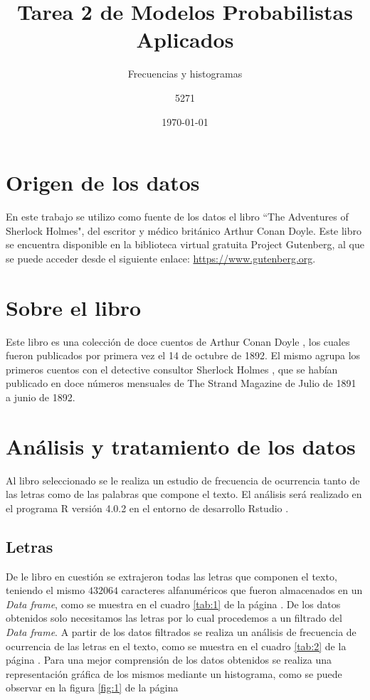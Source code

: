 \documentclass{article}
\title{Tarea 2 de Modelos Probabilistas Aplicados}
\subtitle{Frecuencias y histogramas}
\author{5271}
\date{\today}
\begin{document}
\maketitle

\section{Origen de los datos}

En este trabajo se utilizo como fuente de los datos el libro ``The Adventures of Sherlock Holmes", del escritor y médico británico Arthur Conan Doyle. Este libro se encuentra disponible en la biblioteca virtual gratuita Project Gutenberg, al que se puede acceder desde el siguiente enlace: \href{https://www.gutenberg.org}{https://www.gutenberg.org}. 

\section{Sobre el libro}

Este libro es una colección de doce cuentos de Arthur Conan Doyle , los cuales fueron publicados por primera vez el 14 de octubre de 1892. El mismo agrupa los primeros cuentos con el detective consultor Sherlock Holmes , que se habían publicado en doce números mensuales de The Strand Magazine de Julio de 1891 a junio de 1892. 

\section{Análisis y tratamiento de los datos}

Al libro seleccionado se le realiza un estudio de frecuencia de ocurrencia tanto de las letras como de las palabras que compone el texto. El análisis será realizado en el programa R versión 4.0.2 \cite{r} en el entorno de desarrollo Rstudio \cite{rstudio}. 

\subsection{Letras}
De le libro en cuestión se extrajeron todas las letras que componen el texto, teniendo el mismo $432064$ caracteres alfanuméricos que fueron almacenados en un \textit{Data frame}, como se muestra en el cuadro \ref{tab:1} de la página \pageref{tab:1}. De los datos obtenidos solo necesitamos las letras por lo cual procedemos a un filtrado del \textit{Data frame}. A partir de los datos filtrados se realiza un análisis de frecuencia de ocurrencia de las letras en el texto, como se muestra en el cuadro \ref{tab:2} de la página \pageref{tab:2}. Para una mejor comprensión de los datos obtenidos se realiza una representación gráfica de los mismos mediante un histograma, como se puede observar en la figura  \ref{fig:1} de la página \pageref{fig:1}
\end{document}
